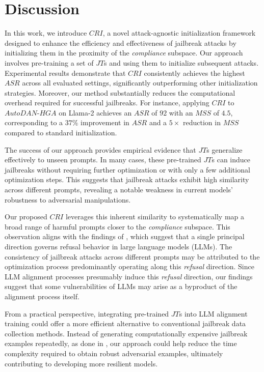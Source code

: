 \section{Discussion}
\label{Discussion}
In this work, we introduce $CRI$, a novel attack-agnostic initialization framework designed to enhance the efficiency and effectiveness of jailbreak attacks by initializing them in the proximity of the \emph{compliance} subspace. Our approach involves pre-training a set of $JT$s and using them to initialize subsequent attacks. Experimental results demonstrate that $CRI$ consistently achieves the highest $ASR$ across all evaluated settings, significantly outperforming other initialization strategies. Moreover, our method substantially reduces the computational overhead required for successful jailbreaks. For instance, applying $CRI$ to $AutoDAN\text{-}HGA$ on Llama-2 achieves an $ASR$ of $92$ with an $MSS$ of $4.5$, corresponding to a $37\%$ improvement in $ASR$ and a $5\times$ reduction in $MSS$ compared to standard initialization.

The success of our approach provides empirical evidence that $JT$s generalize effectively to unseen prompts. In many cases, these pre-trained $JT$s can induce jailbreaks without requiring further optimization or with only a few additional optimization steps. This suggests that jailbreak attacks exhibit high similarity across different prompts, revealing a notable weakness in current models' robustness to adversarial manipulations.

Our proposed $CRI$ leverages this inherent similarity to systematically map a broad range of harmful prompts closer to the \emph{compliance} subspace. This observation aligns with the findings of \citet{arditi2024refusal}, which suggest that a single principal direction governs refusal behavior in large language models (LLMs). The consistency of jailbreak attacks across different prompts may be attributed to the optimization process predominantly operating along this \emph{refusal} direction. Since LLM alignment processes presumably induce this \emph{refusal} direction, our findings suggest that some vulnerabilities of LLMs may arise as a byproduct of the alignment process itself.

From a practical perspective, integrating pre-trained $JT$s into LLM alignment training could offer a more efficient alternative to conventional jailbreak data collection methods. Instead of generating computationally expensive jailbreak examples repeatedly, as done in \citet{mazeika2024harmbench}, our approach could help reduce the time complexity required to obtain robust adversarial examples, ultimately contributing to developing more resilient models.

